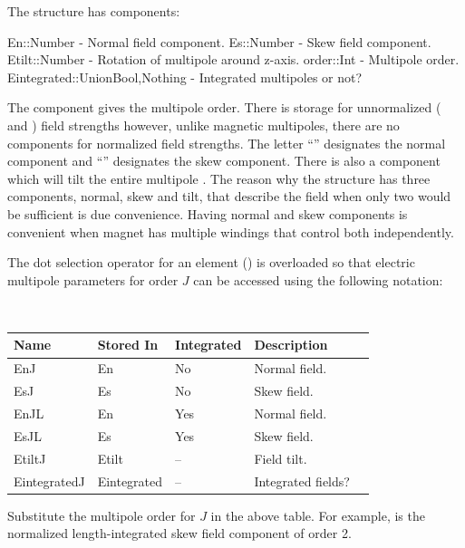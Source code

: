 The  structure has components:
\begin{example}
  En::Number     - Normal field component.
  Es::Number     - Skew field component.
  Etilt::Number  - Rotation of multipole around z-axis.
  order::Int     - Multipole order.
  Eintegrated::Union{Bool,Nothing} - Integrated multipoles or not? 
\end{example}
The  component gives the multipole order.
There is storage for unnormalized ( and ) field strengths however, unlike magnetic
multipoles, there are no components for normalized field strengths. 
The letter ``'' designates the normal component and ``'' designates the skew component. 
There is also a  component which will tilt the entire multipole .
The reason why the structure has three components, 
normal, skew and tilt, that describe the field when only two would be sufficient is due convenience.
Having normal and skew components is convenient when magnet has multiple windings that control
both independently.

The dot selection operator for an element () is overloaded so that 
electric multipole parameters for order $J$ can be accessed using the following notation:
\hfill\break
{\tt
\begin{tabular}{lllll} \toprule
  Name         & Stored In   & Integrated & Description \\ \midrule
  EnJ          & En          & No         & Normal field. \\
  EsJ          & Es          & No         & Skew field. \\
  EnJL         & En          & Yes        & Normal field. \\
  EsJL         & Es          & Yes        & Skew field. \\
  EtiltJ       & Etilt       & --         & Field tilt. \\
  EintegratedJ & Eintegrated & --         & Integrated fields? \\
  \bottomrule
\end{tabular}
} 
\hfill\break
Substitute the multipole order for $J$ in the above table. For example,  is the
normalized length-integrated skew field component of order 2. 

